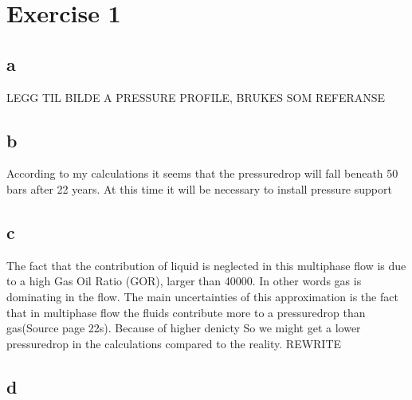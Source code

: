 \documentclass[a4paper,norsk]{article}
\begin{document}
\maketitle
\section{Exercise 1}
\subsection*{a}
LEGG TIL BILDE A PRESSURE PROFILE, BRUKES SOM REFERANSE

\subsection*{b}
According to my calculations it seems that the pressuredrop will fall beneath 50 bars after 22 years. At this time it will be necessary to install pressure support

\subsection*{c}
The fact that the contribution of liquid is neglected in this multiphase flow is due to a high Gas Oil Ratio (GOR), larger than 40000. In other words gas is dominating in the flow. The main uncertainties of this approximation is the fact that in multiphase flow the fluids contribute more to a pressuredrop  than gas(Source page 22s). Because of higher denicty So we might get a lower pressuredrop in the calculations compared to the reality. REWRITE

\subsection*{d}
\end{document}
